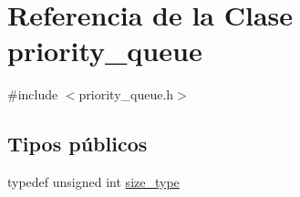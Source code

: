 \hypertarget{classpriority__queue}{
\section{\-Referencia de la \-Clase priority\-\_\-queue}
\label{classpriority__queue}
}


{\ttfamily \#include $<$priority\-\_\-queue.\-h$>$}

\subsection*{\-Tipos públicos}
\begin{DoxyCompactItemize}
\item 
typedef unsigned int \hyperlink{classpriority__queue_ab93fe794e0660e6e882a859f05537ba4}{size\-\_\-type}
\end{DoxyCompactItemize}
